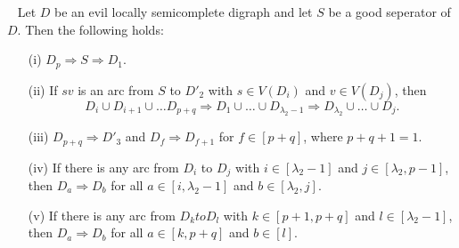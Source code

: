\begin{lemma}~\cite{tildeDMCS}
    Let $D$ be an evil locally semicomplete digraph and let $S$ be a good seperator of $D$. 
    Then the following holds:
    \begin{itemize}
        \item[(i)] $D_p\Rightarrow S\Rightarrow D_1$.
        \item[(ii)] If $sv$ is an arc from $S$ to $D'_2$ with $s\in V(D_i)$ and $v\in V(D_j)$, then 
        \begin{equation*}
            D_i\cup D_{i+1}\cup \dots D_{p+q}\Rightarrow D_1\cup\dots \cup D_{\lambda_2-1}\Rightarrow D_{\lambda_2}\cup \dots \cup D_j.
        \end{equation*}
        \item[(iii)] $D_{p+q}\Rightarrow D'_3$ and $D_f\Rightarrow D_{f+1}$ for $f\in [p+q]$, where $p+q+1=1$.
        \item[(iv)] If there is any arc from $D_i$ to $D_j$ with $i\in [\lambda_2-1]$ and $j\in [\lambda_2,p-1]$, then $D_a\Rightarrow D_b$ for all $a\in [i,\lambda_2-1]$ and $b\in[\lambda_2,j]$.
        \item[(v)] If there is any arc from $D_k to D_l$ with $k\in [p+1,p+q]$ and $l\in [\lambda_2-1]$, then $D_a\Rightarrow D_b$ for all $a\in [k,p+q]$ and $b\in [l]$.   
    \end{itemize}
\end{lemma}
